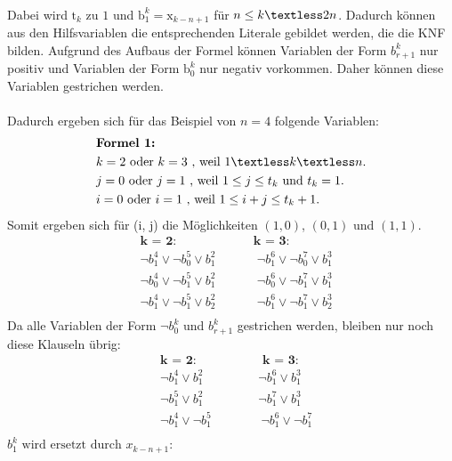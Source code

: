 \documentclass[a4,abstract=on]{scrartcl}
\begin{document}
\ \\
Dabei wird $\text{t}_k$ zu $1$ und $\text{b}_1^k = \text{x}_{k-n+1}$ für $n \leq k \textless 2n$. Dadurch können aus den Hilfsvariablen die entsprechenden Literale gebildet werden, die die KNF bilden.
Aufgrund des Aufbaus der Formel können Variablen der Form $b_{r+1}^k$ nur positiv und Variablen der Form $\text{b}_0^k$ nur negativ vorkommen. Daher können diese Variablen gestrichen werden.\\
\ \\
Dadurch ergeben sich für das Beispiel von $n=4$ folgende Variablen:\\
\begin{align*}
&\textbf{Formel 1:}\\
&k=2 \text{ oder } k=3 \text{ , weil } 1 \textless k \textless n.\\
&j=0 \text{ oder } j=1 \text{ , weil } 1 \leq j \leq t_k \text{ und } t_k = 1.\\
&i=0 \text{ oder } i=1 \text{ , weil } 1\leq i+j \leq t_{k}+1.\\
\end{align*}
Somit ergeben sich für (i, j) die Möglichkeiten $(1,0)$, $(0,1)$ und $(1,1)$.\\
\begin{align*}
&\textbf{k = 2:} {~~~~~~~~~~~~~~~~~~~~~~~~~~~~} \textbf{k = 3:}\\
&\neg b_1^4 \vee \neg b_0^5 \vee b_1^2 {~~~~~~~~~~~~~~~} \neg b_1^6 \vee \neg b_0^7 \vee b_1^3\\
&\neg b_0^4 \vee \neg b_1^5 \vee b_1^2 {~~~~~~~~~~~~~~~} \neg b_0^6 \vee \neg b_1^7 \vee b_1^3\\
&\neg b_1^4 \vee \neg b_1^5 \vee b_2^2 {~~~~~~~~~~~~~~~} \neg b_1^6 \vee \neg b_1^7 \vee b_2^3\\
\end{align*}
Da alle Variablen der Form $\neg b_0^k$ und $b_{r+1}^k$  gestrichen werden, bleiben nur noch diese Klauseln übrig:\\
\begin{align*}
&\textbf{k = 2:} {~~~~~~~~~~~~~~~~~~~~~~~~} \textbf{k = 3:}\\
&\neg b_1^4  \vee b_1^2 {~~~~~~~~~~~~~~~~~~~~}\neg b_1^6 \vee b_1^3\\
&\neg b_1^5 \vee b_1^2  {~~~~~~~~~~~~~~~~~~~~}\neg b_1^7 \vee b_1^3\\
&\neg b_1^4 \vee \neg b_1^5 {~~~~~~~~~~~~~~~~~~}\neg b_1^6 \vee \neg b_1^7\\
\end{align*}
$b_1^k \text{ wird ersetzt durch } x_{k-n+1}$:
\end{document}
